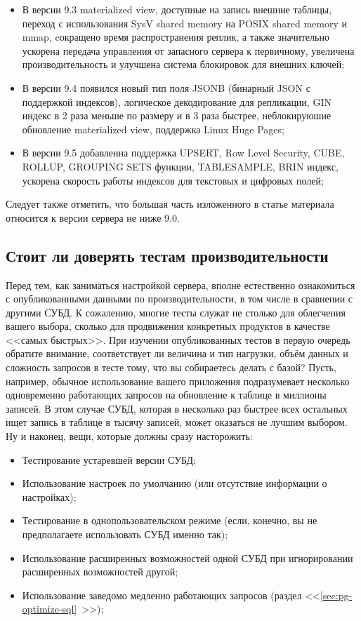 \begin{itemize}
  \item В версии 9.3 materialized view, доступные на запись внешние таблицы, переход с использования SysV shared memory на POSIX shared memory и mmap, cокращено время распространения реплик, а также значительно ускорена передача управления от запасного сервера к первичному, увеличена производительность и улучшена система блокировок для внешних ключей;
  \item В версии 9.4 появился новый тип поля JSONB (бинарный JSON с поддержкой индексов), логическое декодирование для репликации, GIN индекс в 2 раза меньше по размеру и в 3 раза быстрее, неблокируюшие обновление materialized view, поддержка Linux Huge Pages;
  \item В версии 9.5 добавленна поддержка UPSERT, Row Level Security, CUBE, ROLLUP, GROUPING SETS функции, TABLESAMPLE, BRIN индекс, ускорена скорость работы индексов для текстовых и цифровых полей;
\end{itemize}

Следует также отметить, что большая часть изложенного в статье материала относится к версии сервера не ниже 9.0.


\subsection{Стоит ли доверять тестам производительности}

Перед тем, как заниматься настройкой сервера, вполне естественно ознакомиться с опубликованными данными по производительности, в том числе в сравнении с другими СУБД. К сожалению, многие тесты служат не столько для облегчения вашего выбора, сколько для продвижения конкретных продуктов в качестве <<самых быстрых>>. При изучении опубликованных тестов в первую очередь обратите внимание, соответствует ли величина и тип нагрузки, объём данных и сложность запросов в тесте тому, что вы собираетесь делать с базой? Пусть, например, обычное использование вашего приложения подразумевает несколько одновременно работающих запросов на обновление к таблице в миллионы записей. В этом случае СУБД, которая в несколько раз
быстрее всех остальных ищет запись в таблице в тысячу записей, может оказаться не лучшим выбором. Ну и наконец, вещи, которые должны сразу насторожить:

\begin{itemize}
  \item Тестирование устаревшей версии СУБД;
  \item Использование настроек по умолчанию (или отсутствие информации о настройках);
  \item Тестирование в однопользовательском режиме (если, конечно, вы не предполагаете использовать СУБД именно так);
  \item Использование расширенных возможностей одной СУБД при игнорировании расширенных возможностей другой;
  \item Использование заведомо медленно работающих запросов (раздел <<\ref{sec:pg-optimize-sql}~>>);
\end{itemize}

